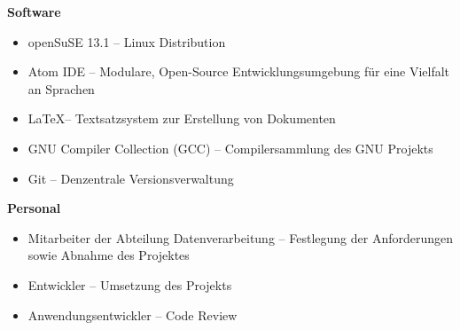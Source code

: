 \textbf{Software}
\begin{itemize}
    \item openSuSE 13.1 -- Linux Distribution
    \item Atom IDE -- Modulare, Open-Source Entwicklungsumgebung für eine Vielfalt an Sprachen
    \item \LaTeX -- Textsatzsystem zur Erstellung von Dokumenten
    \item GNU Compiler Collection (GCC) -- Compilersammlung des GNU Projekts
    \item Git -- Denzentrale Versionsverwaltung
\end{itemize}

\textbf{Personal}
\begin{itemize}
    \item Mitarbeiter der Abteilung Datenverarbeitung -- Festlegung der Anforderungen sowie Abnahme des Projektes
    \item Entwickler -- Umsetzung des Projekts
    \item Anwendungsentwickler -- Code Review
\end{itemize}


